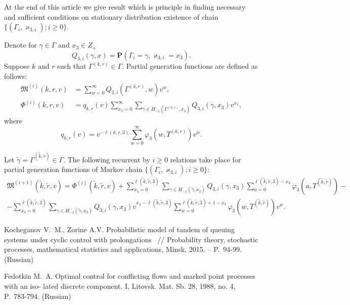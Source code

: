 \documentclass[10pt]{article}
\renewcommand{\Pr}{{\mathbf P}}
\begin{document}
At the end of this article we give result which is principle in finding necessary and sufficient conditions on stationary distribution existence of chain $\{(\Gamma_i, \varkappa_{3, i}); i \geqslant 0\}$.

Denote for $\gamma \in \Gamma$ and $x_3 \in Z_+$
\begin{equation}
Q_{3,i}(\gamma,x) = \Pr(\Gamma_{i}=\gamma, \varkappa_{3,i}=x_3).
\end{equation}
Suppose $k$ and $r$ such that $\Gamma^{(k,r)}\in \Gamma$. Partial generation functions are defined as follows:
\begin{align*}
\mathfrak{M}^{(i)}(k,r,v) &= \sum_{w=0}^{\infty} Q_{3,i}(\Gamma^{(k,r)},w) v^w,\\
\Phi^{(i)}(k,r,v) &= q_{k,r}(v) \sum_{x_3=0}^{\infty} \sum_{\gamma \in H_{-1}(\Gamma^{(k,r)},x_3)} Q_{3,i}(\gamma,x_3) v^{x_3},
\end{align*}
where
\begin{equation*}
q_{k,r}(v) = v^{-\ell(k,r,3)}\sum_{w=0}^{\infty} \varphi_3(w,T^{(k,r)})v^w.
\end{equation*}

\begin{thm}
Let $\tilde{\gamma}=\Gamma^{(\tilde{k},\tilde{r})} \in \Gamma$. The following recurrent by $i \geqslant 0$ relations take place for partial generation functions of Markov chain $\{(\Gamma_i, \varkappa_{3, i}); i \geqslant 0\}$:
\begin{multline}
\mathfrak{M}^{(i+1)}(\tilde{k},\tilde{r},v) = \Phi^{(i)}(\tilde{k},\tilde{r},v)+\sum_{x_3=0}^{\ell(\tilde{k},\tilde{r},3)}\sum_{\gamma \in H_{-1}(\tilde{\gamma},x_3)} Q_{3,i}(\gamma,x_3) \sum_{a=0}^{\ell(\tilde{k},\tilde{r},3) - x_3} \varphi_3(a,T^{(\tilde{k},\tilde{r})}) - \\
- \sum_{x_3=0}^{\ell(\tilde{k},\tilde{r},3)}  \sum_{\gamma \in H_{-1}(\tilde{\gamma},x_3)} Q_{3,i}(\gamma,x_3) v^{x_3-\ell(\tilde{k},\tilde{r},3)}  \sum_{w=0}^{\ell(\tilde{k},\tilde{r},3) + 1 -x_3}\varphi_3(w,T^{(\tilde{k},\tilde{r})}) v^w.
\label{markk_proiz}
\end{multline}
\end{thm}



\begin{thebibliography}{99}
Kocheganov V.~M., Zorine A.V. Probabilistic model of tandem of queuing systems under cyclic control with prolongations ~// Probability theory, stochastic processes, mathematical statistics and applications, Minsk, 2015. -- P.~94-99. (Russian)

 Fedotkin M.~A. Optimal control for conflicting flows and marked point processes with an iso-
lated discrete component. I, Litovsk. Mat. Sb. 28, 1988, no. 4, P.~783-794. (Russian)

\end{thebibliography}
\end{document}
